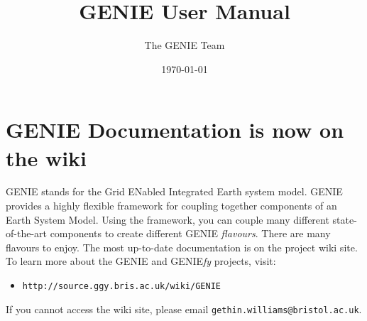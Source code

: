 \documentclass [10pt]{article}
\title{GENIE User Manual}
\author{The GENIE Team}
\date{\today}
\begin{document}
\maketitle

\section{GENIE Documentation is now on the wiki}

GENIE stands for the Grid ENabled Integrated Earth system model.  GENIE provides a highly flexible framework for coupling together components of an Earth System Model.  Using the framework, you can couple many different state-of-the-art components to create different GENIE \emph{flavours}.  There are many flavours to enjoy.  The most up-to-date documentation is on the project wiki site.  To learn more about the GENIE and GENIE\emph{fy} projects, visit:

\begin{itemize}
\item \texttt{http://source.ggy.bris.ac.uk/wiki/GENIE}
\end{itemize}

If you cannot access the wiki site, please email \texttt{gethin.williams@bristol.ac.uk}.
\end{document}
